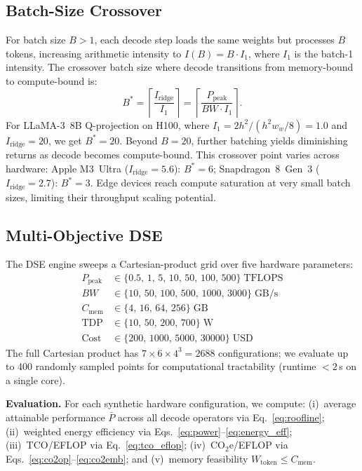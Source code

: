\documentclass[journal]{IEEEtran}
\begin{document}
\subsection{Batch-Size Crossover}
\label{sec:batch}

For batch size $B{>}1$, each decode step loads the same weights but
processes $B$ tokens, increasing arithmetic intensity to $I(B) = B \cdot I_1$,
where $I_1$ is the batch-1 intensity.
The crossover batch size where decode transitions from memory-bound to
compute-bound is:
\begin{equation}
  B^* = \left\lceil \frac{I_\text{ridge}}{I_1} \right\rceil
  = \left\lceil \frac{P_\text{peak}}{BW \cdot I_1} \right\rceil.
  \label{eq:bstar}
\end{equation}
For LLaMA-3~8B Q-projection on H100, where
$I_1 {=} 2h^2 / (h^2 w_w/8) {=} 1.0$ and
$I_\text{ridge}{=}20$, we get $B^*{=}20$.
Beyond $B{=}20$, further batching yields diminishing returns as decode
becomes compute-bound.
This crossover point varies across hardware:
Apple M3~Ultra ($I_\text{ridge}{=}5.6$): $B^*{=}6$;
Snapdragon~8~Gen~3 ($I_\text{ridge}{=}2.7$): $B^*{=}3$.
Edge devices reach compute saturation at very small batch sizes,
limiting their throughput scaling potential.

\subsection{Multi-Objective DSE}

The DSE engine sweeps a Cartesian-product grid over five hardware
parameters:
\begin{equation}
\begin{aligned}
P_\text{peak} &\in \{0.5,\,1,\,5,\,10,\,50,\,100,\,500\}\;\text{TFLOPS}\\
BW &\in \{10,\,50,\,100,\,500,\,1000,\,3000\}\;\text{GB/s}\\
C_\text{mem} &\in \{4,\,16,\,64,\,256\}\;\text{GB}\\
\text{TDP} &\in \{10,\,50,\,200,\,700\}\;\text{W}\\
\text{Cost} &\in \{200,\,1000,\,5000,\,30000\}\;\text{USD}
\end{aligned}
\label{eq:dse_params}
\end{equation}
The full Cartesian product has $7{\times}6{\times}4^3 = 2688$
configurations; we evaluate up to 400 randomly sampled points
for computational tractability (runtime ${<}2$\,s on a single core).

\noindent\textbf{Evaluation.}
For each synthetic hardware configuration, we compute:
(i)~average attainable performance $\bar{P}$ across all decode operators
via Eq.~\ref{eq:roofline};
(ii)~weighted energy efficiency via Eqs.~\ref{eq:power}--\ref{eq:energy_eff};
(iii)~TCO/EFLOP via Eq.~\ref{eq:tco_eflop};
(iv)~CO$_2$e/EFLOP via Eqs.~\ref{eq:co2op}--\ref{eq:co2emb};
and (v)~memory feasibility $W_\text{token} \leq C_\text{mem}$.
\end{document}
